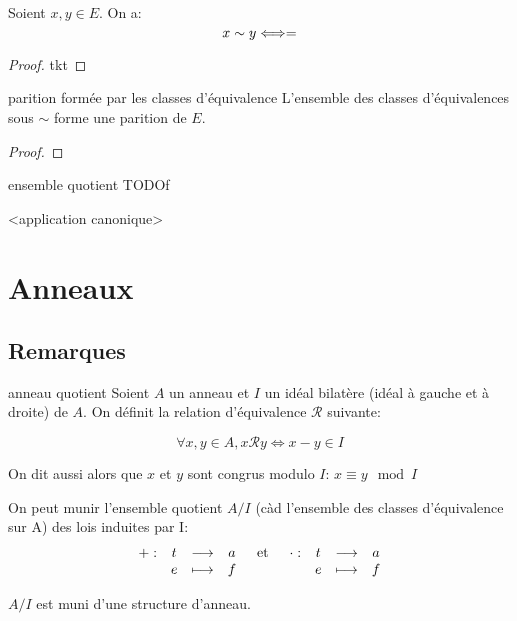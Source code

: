 \begin{lemma}{}{}
    Soient $x,y \in E$. On a:
    \[ x \sim y \Longleftrightarrow \title{x} = \title{y} \]
\end{lemma}

\begin{proof}
    tkt
\end{proof}

\begin{theorem}{parition formée par les classes d'équivalence}{}
    L'ensemble des classes d'équivalences sous $\sim$ forme une parition de $E$.
\end{theorem}

\begin{proof}
    
\end{proof}

\begin{definition}{ensemble quotient}{}
    TODOf
\end{definition}

<application canonique>


\section{Anneaux}

\subsection{Remarques}

\begin{definition}{anneau quotient}{}
    Soient $A$ un anneau et $I$ un idéal bilatère (idéal à gauche et à droite) de $A$.
    On définit la relation d'équivalence $\mathscr{R}$ suivante:

    \[ \forall x, y \in A, x \mathscr{R} y \Longleftrightarrow x - y \in I \]

    On dit aussi alors que $x$ et $y$ sont congrus modulo $I$: $x \equiv y \mod I$

    On peut munir l'ensemble quotient $A/I$ (càd l'ensemble des classes d'équivalence sur A) des lois induites par I:
    \[ \begin{array}{lcr}
        \begin{array}[t]{cccc}+ : & t & \longrightarrow & a \\ & e & \longmapsto & f\end{array} & \text{et} & \begin{array}[t]{cccc}\cdot : & t & \longrightarrow & a \\ & e & \longmapsto & f\end{array}
    \end{array} \]

    $A/I$ est muni d'une structure d'anneau.

\end{definition}

